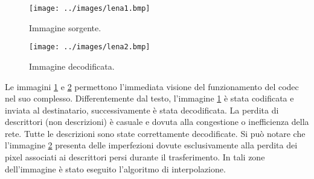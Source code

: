 \begin{figure}[ht]
\centering \texttt{[image: ../images/lena1.bmp]}
	\caption{Immagine sorgente.}
	\label{fig:sorgente}
\end{figure}

\begin{figure}[ht]
\centering \texttt{[image: ../images/lena2.bmp]}
	\caption{Immagine decodificata.}
	\label{fig:decodificata}
\end{figure}

Le immagini \ref{fig:sorgente} e \ref{fig:decodificata} permettono
l'immediata visione del funzionamento del codec nel suo complesso. Differentemente dal testo, l'immagine \ref{fig:sorgente} è stata
codificata e inviata al destinatario, successivamente è stata decodificata. La
perdita di descrittori (non descrizioni) è casuale e dovuta alla congestione o
inefficienza della rete. Tutte le descrizioni sono state correttamente
decodificate. Si può notare che l'immagine \ref{fig:decodificata} presenta delle
imperfezioni dovute esclusivamente alla perdita dei pixel associati ai descrittori persi
durante il trasferimento. In tali zone dell'immagine è stato eseguito
l'algoritmo di interpolazione.